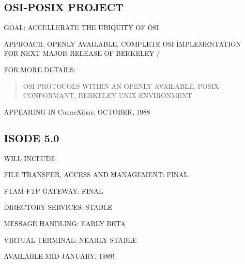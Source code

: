 \begin{bwslide}
\part*	{OSI-POSIX PROJECT}\bf

\begin{nrtc}
\item	GOAL: ACCELLERATE THE UBIQUITY OF OSI

\item	APPROACH: OPENLY AVAILABLE, COMPLETE OSI IMPLEMENTATION FOR NEXT MAJOR
	RELEASE OF BERKELEY \unix/

\item	FOR MORE DETAILS:
\begin{quote}
OSI PROTOCOLS WITHIN AN OPENLY AVAILABLE, POSIX-CONFORMANT, BERKELEY UNIX
ENVIRONMENT
\end{quote}
APPEARING IN ConneXions, OCTOBER, 1988
\end{nrtc}
\end{bwslide}


\begin{bwslide}
\end{bwslide}


\begin{bwslide}
\end{bwslide}


\begin{bwslide}
\part*	{ISODE 5.0}\bf

\begin{nrtc}
\item	WILL INCLUDE
    \begin{nrtc}
    \item	FILE TRANSFER, ACCESS AND MANAGEMENT: FINAL

    \item	FTAM-FTP GATEWAY: FINAL

    \item	DIRECTORY SERVICES: STABLE

    \item	MESSAGE HANDLING: EARLY BETA

    \item	VIRTUAL TERMINAL: NEARLY STABLE
    \end{nrtc}

\item	AVAILABLE MID-JANUARY, 1989!
\end{nrtc}
\end{bwslide}



